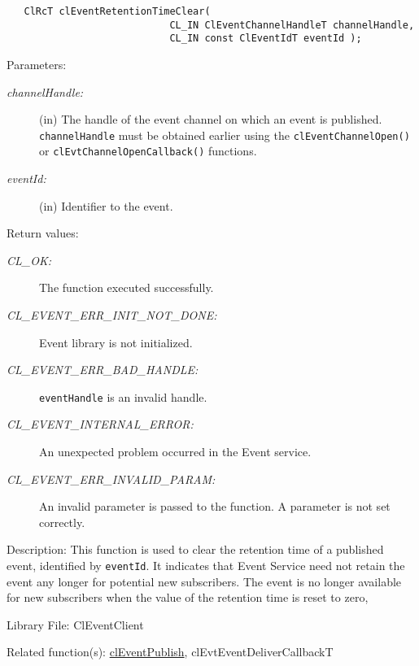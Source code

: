 \begin{flushleft}
\begin{Desc}
\footnotesize\begin{verbatim}   ClRcT clEventRetentionTimeClear(
              				CL_IN ClEventChannelHandleT channelHandle,
              				CL_IN const ClEventIdT eventId );
\end{verbatim}
\normalsize
\end{Desc}
\begin{Desc}
\item[Parameters:]
\begin{description}
\item[{\em channel\-Handle:}](in) The handle of the event channel on which an event is published. {\tt{channel\-Handle}} must be obtained
earlier using the {\tt{clEventChannelOpen()}} or {\tt{cl\-Evt\-Channel\-Open\-Callback()}} functions.
\item[{\em event\-Id:}](in) Identifier to the event.\end{description}
\end{Desc}
\begin{Desc}
\item[Return values:]
\begin{description}
\item[{\em CL\_\-OK:}]The function executed successfully. 
\item[{\em CL\_\-EVENT\_\-ERR\_\-INIT\_\-NOT\_\-DONE:}]Event library is not initialized. 
\item[{\em CL\_\-EVENT\_\-ERR\_\-BAD\_\-HANDLE:}]{\tt{eventHandle}} is an invalid handle.
\item[{\em CL\_\-EVENT\_\-INTERNAL\_\-ERROR:}]An unexpected problem occurred in the Event service. 
\item[{\em CL\_\-EVENT\_\-ERR\_\-INVALID\_\-PARAM:}]An invalid parameter is passed to the function. A parameter is not set correctly.
\end{description}
\end{Desc}
\begin{Desc}
\item[Description:]This function is used to clear the retention time of a published event, identified by {\tt{eventId}}. It indicates that Event Service need 
not retain the event any longer for potential new subscribers. 
The event is no longer available for new subscribers when the value of the retention time is reset to zero, 
\end{Desc}
\begin{Desc}
\item[Library File:]Cl\-Event\-Client\end{Desc}
\begin{Desc}
\item[Related function(s):]\hyperlink{pageem113}{cl\-Event\-Publish}, cl\-Evt\-Event\-Deliver\-Callback\-T \end{Desc}
\newpage



\end{flushleft}
